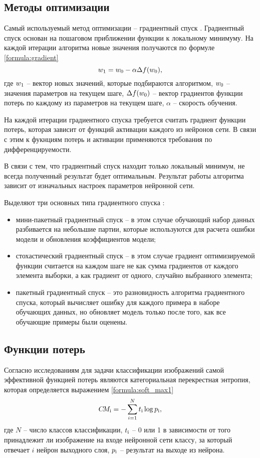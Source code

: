 \subsection{Методы оптимизации}
Самый используемый метод оптимизации -- градиентный спуск \cite{gradient}. Градиентный спуск основан на пошаговом приближении функции к локальному минимуму. На каждой итерации алгоритма новые значения получаются по формуле \ref{formula:gradient}
\begin{equation}\label{formula:gradient}
w_{\rm{1}} = w_{\rm{0}} - \alpha\Delta f(w_{\rm{0}}),
\end{equation}
где $w_{\rm{1}}$ -- вектор новых значений, которые подбираются алгоритмом, $w_{\rm{0}}$ -- значения параметров на текущем шаге, $\Delta f(w_{\rm{0}})$ -- вектор градиентов функции потерь по каждому из параметров на текущем шаге, $\alpha$ -- скорость обучения. 

На каждой итерации градиентного спуска требуется считать градиент функции потерь, которая зависит от функций активации каждого из нейронов сети. В связи с этим к фукнциям потерь и активации применяются требования по дифференцируемости.

В связи с тем, что градиентный спуск находит только локальный минимум, не всегда полученный результат будет оптимальным. Результат работы алгоритма зависит от изначальных настроек параметров нейронной сети.

Выделяют три основных типа градиентного спуска \cite{gradient}:
\begin{itemize}
	\item мини-пакетный градиентный спуск -- в этом случае обучающий набор данных разбивается на небольшие партии, которые используются для расчета ошибки модели и обновления коэффициентов модели;
	\item стохастический градиентный спуск -- в этом случае градиент
	оптимизируемой функции считается на каждом шаге не как сумма
	градиентов от каждого элемента выборки, а как градиент от одного,
	случайно выбранного элемента;
	\item пакетный градиентный спуск -- это разновидность
	алгоритма градиентного спуска, который вычисляет ошибку для
	каждого примера в наборе обучающих данных, но обновляет модель
	только после того, как все обучающие примеры были оценены.
\end{itemize}

\subsection{Функции потерь}
Согласно исследованиям \cite{loss_function} для задачи классификации изображений самой эффективной функцией потерь являются категориальная перекрестная энтропия, которая определяется выражением \ref{formula:soft_max1}
\begin{equation}\label{formula:soft_max1}
C\!M_{\rm{i}} = - \sum\limits_{i = 1}^{N}t_{\rm{i}}\log{p_{\rm{i}}},
\end{equation}
где $N$ -- число классов классификации, $t_{\rm{i}}$ -- 0 или 1 в зависимости от того принадлежит ли изображение на входе нейронной сети классу, за который отвечает $i$ нейрон выходного слоя, $p_{\rm{i}}$ -- результат на выходе из нейрона.

